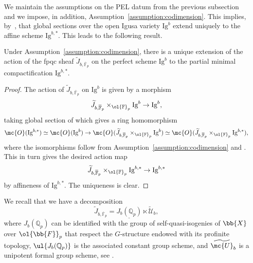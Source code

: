 \documentclass[letterpaper,11pt]{amsart}
\begin{document}
We maintain the assumptions on the PEL datum from the previous subsection and we impose, in addition, Assumption~\ref{assumption:codimension}. This implies, by~\cite[Corollary 9.24]{zhang2023}, that global sections over the open Igusa variety $\mathrm{Ig}^b$ extend uniquely to the affine scheme $\mathrm{Ig}^{b,*}$. This leads to the following result. 
\begin{lemma}\label{lemma: UniqueExistenceJbAction}
Under Assumption~\ref{assumption:codimension}, there is a unique extension of the action of the fpqc sheaf $\widetilde{J}_{b, \overline{\mathbb{F}}_p}$ on the perfect scheme $\mathrm{Ig}^b$ to the partial minimal compactification $\mathrm{Ig}^{b,*}$.     
\end{lemma}
\begin{proof}
The action of $\widetilde{J}_{b, \overline{\mathbb{F}}_p}$ on $\mathrm{Ig}^b$ is given by a morphism 
\[\widetilde{J}_{b, \overline{\mathbb{F}}_p}\times_{\ol{\mathbb{F}}_p} \mathrm{Ig}^b\to \mathrm{Ig}^b,\]
taking global section of which gives a ring homomorphism
\[\mc{O}(\mathrm{Ig}^{b,\ast})\simeq \mc{O}(\mathrm{Ig}^b)\to \mc{O}(\widetilde{J}_{b, \overline{\mathbb{F}}_p}\times_{\ol{\mathbb{F}}_p} \mathrm{Ig}^b)\simeq \mc{O}(\widetilde{J}_{b,\overline{\mathbb{F}}_p}\times_{\ol{\mathbb{F}}_p} \mathrm{Ig}^{b,\ast}), \]
where the isomorphisms follow from Assumption~\ref{assumption:codimension} and \cite[Proposition 1.9]{zhang2023}. This in turn gives the desired action map \[\widetilde{J}_{b, \overline{\mathbb{F}}_p}\times_{\ol{\mathbb{F}}_p} \mathrm{Ig}^{b,\ast}\to \mathrm{Ig}^{b,\ast}\]
by affineness of $\mathrm{Ig}^{b,\ast}$. The uniqueness is clear.
\end{proof}
We recall that we have a decomposition 
 \begin{equation}\label{eq:Jb decomposition}
 \widetilde{J}_{b,\overline{\mathbb{F}}_p} = \underline{J_b(\mathbb{Q}_p)}\ltimes \widetilde{\mathcal{U}}_b,   
 \end{equation}
where $J_b(\mathbb{Q}_p)$ can be identified with the group of self-quasi-isogenies of $\bb{X}$ over $\ol{\bb{F}}_p$ that respect the $G$-structure endowed with its profinite topology, $\ul{J_b(\mathbb{Q}_p)}$ is the associated constant group scheme, and $\widetilde{\mc{U}}_b$ is a unipotent formal group scheme, see \cite[Proposition 4.2.11]{CS17}.
\end{document}
